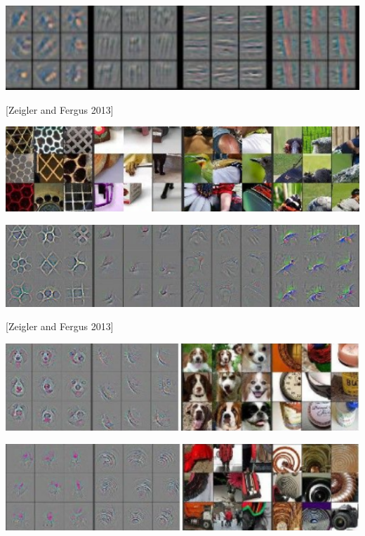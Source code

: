 {\centerline{\includegraphics[width = 8in]{../images/Deconv2}}

\centerline{[Zeigler and Fergus 2013]}


\centerline{\includegraphics[width = 8in]{../images/Deconv3IM}}

\centerline{\includegraphics[width = 8in]{../images/Deconv3}}

\centerline{[Zeigler and Fergus 2013]}


\centerline{\includegraphics[width = 8in]{../images/Deconv4a}}

\centerline{\includegraphics[width = 8in]{../images/Deconv4b}}

}
